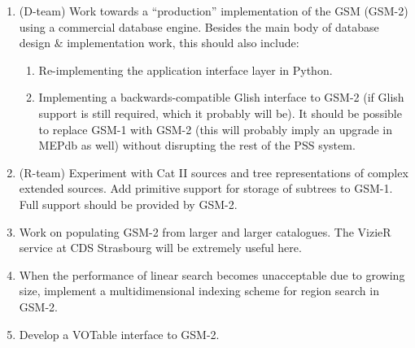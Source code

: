 \documentclass[10pt]{article}
\begin{document}
\begin{enumerate}
\item (D-team) Work towards a ``production'' implementation of the GSM
(GSM-2) using a commercial database engine. Besides the main body of database
design \& implementation work, this should also include:

\begin{enumerate}
\item Re-implementing the application interface layer in Python.
\item Implementing a backwards-compatible Glish interface to GSM-2 (if Glish support is
still required, which it probably will be). It should be possible to replace
GSM-1 with GSM-2 (this will probably imply an upgrade in MEPdb as well) 
without disrupting the rest of the PSS system.
\end{enumerate}

\item (R-team) Experiment with Cat II sources and tree representations of
complex extended sources. Add primitive support for storage of subtrees to
GSM-1. Full support should be provided by GSM-2.

\item Work on populating GSM-2 from larger and larger catalogues. The VizieR
service at CDS Strasbourg \cite{vizier} will be extremely useful here.

\item When the performance of linear search becomes unacceptable due to growing
size, implement a multidimensional indexing scheme for region search in GSM-2.

\item Develop a VOTable interface to GSM-2.
\end{enumerate}
\end{document}
